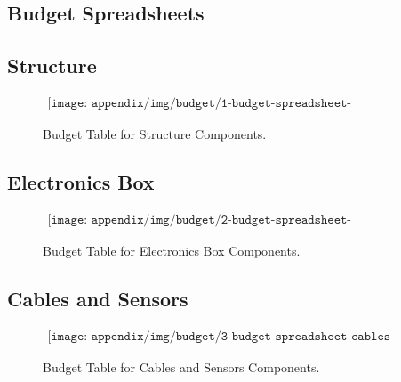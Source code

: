 
\begin{landscape}
\section{Budget Spreadsheets}
\label{sec:appO}

\subsection{Structure}

\begin{figure}[H]
    \begin{align*}
        \texttt{[image: appendix/img/budget/1-budget-spreadsheet-structure.png]}
    \end{align*}
    \caption{Budget Table for Structure Components.}
    \label{fig:budget-table-for-structure-components}
\end{figure}
\end{landscape}

\begin{landscape}
\subsection{Electronics Box}
\begin{figure}[H]
    \begin{align*}
        \texttt{[image: appendix/img/budget/2-budget-spreadsheet-electronics-box.png]}
    \end{align*}
    \caption{Budget Table for Electronics Box Components.}
    \label{fig:budget-table-for-electronics-box-components}
\end{figure}
\end{landscape}

\begin{landscape}
\subsection{Cables and Sensors}
\begin{figure}[H]
    \begin{align*}
        \texttt{[image: appendix/img/budget/3-budget-spreadsheet-cables-and-sensors.png]}
    \end{align*}
    \caption{Budget Table for Cables and Sensors Components.}
    \label{fig:budget-table-for-cables-and-sensors-components}
\end{figure}
\end{landscape}


